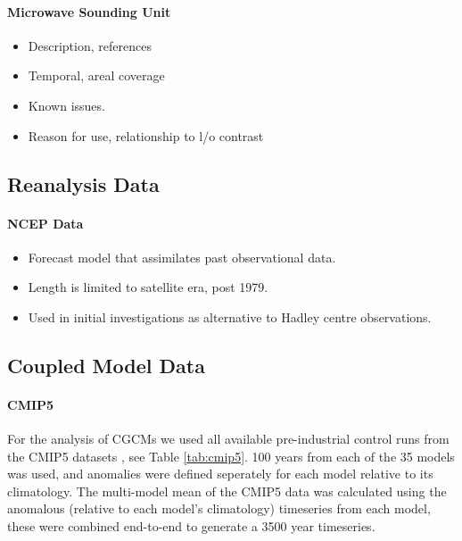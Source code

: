 \paragraph{Microwave Sounding Unit}
\begin{itemize}
	\item Description, references
	\item Temporal, areal coverage
	\item Known issues.
	\item Reason for use, relationship to l/o contrast
\end{itemize}


\subsection{Reanalysis Data}

\paragraph{NCEP Data}
\begin{itemize}
	\item Forecast model that assimilates past observational data.
	\item Length is limited to satellite era, post 1979.
	\item Used in initial investigations as alternative to Hadley centre 
		observations.
\end{itemize}


\subsection{Coupled Model Data}

\paragraph{CMIP5}
For the analysis of CGCMs we used all available pre-industrial control runs from 
the CMIP5 datasets \citep{Taylor2012}, see Table \ref{tab:cmip5}. 100 years from 
each of the 35 models was used, and anomalies were defined seperately for each 
model relative to its climatology. The multi-model mean of the CMIP5 data was 
calculated using the anomalous (relative to each model’s climatology) timeseries 
from each model, these were combined end-to-end to generate a 3500 year 
timeseries. 



